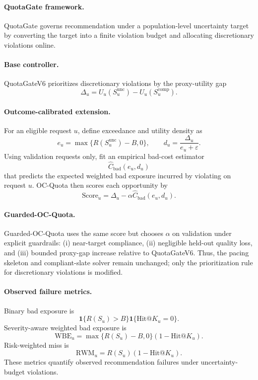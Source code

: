\paragraph{QuotaGate framework.}
QuotaGate governs recommendation under a population-level uncertainty target by converting the target into a finite violation budget and allocating discretionary violations online.

\paragraph{Base controller.}
QuotaGateV6 prioritizes discretionary violations by the proxy-utility gap
\[
\Delta_u = U_u(S_u^{\mathrm{unc}}) - U_u(S_u^{\mathrm{comp}}).
\]

\paragraph{Outcome-calibrated extension.}
For an eligible request $u$, define exceedance and utility density as
\[
e_u = \max\{R(S_u^{\mathrm{unc}})-B,0\}, \qquad
d_u = \frac{\Delta_u}{e_u+\varepsilon}.
\]
Using validation requests only, fit an empirical bad-cost estimator
\[
\widehat{C}_{\mathrm{bad}}(e_u,d_u)
\]
that predicts the expected weighted bad exposure incurred by violating on request $u$.
OC-Quota then scores each opportunity by
\[
\mathrm{Score}_u = \Delta_u - \alpha \widehat{C}_{\mathrm{bad}}(e_u,d_u).
\]

\paragraph{Guarded-OC-Quota.}
Guarded-OC-Quota uses the same score but chooses $\alpha$ on validation under explicit guardrails:
(i) near-target compliance,
(ii) negligible held-out quality loss, and
(iii) bounded proxy-gap increase relative to QuotaGateV6.
Thus, the pacing skeleton and compliant-slate solver remain unchanged; only the prioritization rule for discretionary violations is modified.

\paragraph{Observed failure metrics.}
Binary bad exposure is
\[
\mathbf{1}\{R(S_u)>B\}\mathbf{1}\{\mathrm{Hit@}K_u=0\}.
\]
Severity-aware weighted bad exposure is
\[
\mathrm{WBE}_u = \max\{R(S_u)-B,0\}(1-\mathrm{Hit@}K_u).
\]
Risk-weighted miss is
\[
\mathrm{RWM}_u = R(S_u)(1-\mathrm{Hit@}K_u).
\]
These metrics quantify observed recommendation failures under uncertainty-budget violations.

